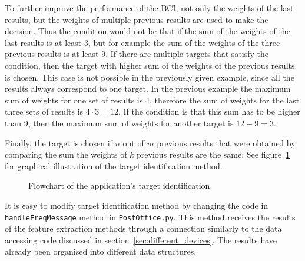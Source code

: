 To further improve the performance of the \gls{BCI}, not only the weights of the last results, but the weights of multiple previous results are used to make the decision. Thus the condition would not be that if the sum of the weights of the last results is at least 3, but for example the sum of the weights of the three previous results is at least 9. If there are multiple \glspl{target} that satisfy the condition, then the \gls{target} with higher sum of the weights of the previous results is chosen. This case is not possible in the previously given example, since all the results always correspond to one \gls{target}. In the previous example the maximum sum of weights for one set of results is 4, therefore the sum of weights for the last three sets of results is $4\cdot 3=12$. If the condition is that this sum has to be higher than 9, then the maximum sum of weights for another \gls{target} is $12-9=3$.

Finally, the \gls{target} is chosen if $n$ out of $m$ previous results that were obtained by comparing the sum the weights of $k$ previous results are the same. See figure~\ref{fig:target_identification} for graphical illustration of the \gls{target} identification method.

\begin{figure}[h!]
	\centering
	
	\caption{Flowchart of the application's target identification.}
	\label{fig:target_identification}
\end{figure}



It is easy to modify \gls{target} identification method by changing the code in \texttt{handleFreqMessage} method in \texttt{PostOffice.py}. This method receives the results of the \gls{feature extraction} methods through a connection similarly to the data accessing code discussed in section~\ref{sec:different_devices}. The results have already been organised into different data structures. %

